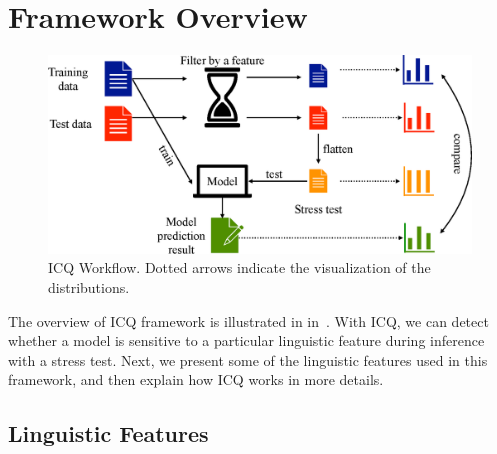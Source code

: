 \section{Framework Overview}
\label{sec:system}

\begin{figure}[th]
\centering
\includegraphics[width=1.0\columnwidth]{picture/framework.eps}
\caption{ICQ Workflow. Dotted arrows indicate the visualization of 
the distributions.}
\label{fig:framework}
\end{figure}

The overview of ICQ framework is illustrated in in~. 
With ICQ, we can detect whether a model is 
sensitive to a particular linguistic feature during inference with a 
stress test.
Next, we present some of the linguistic features used in this framework,
and then explain how ICQ works in more details.

\subsection{Linguistic Features}
\label{sec:extract}


